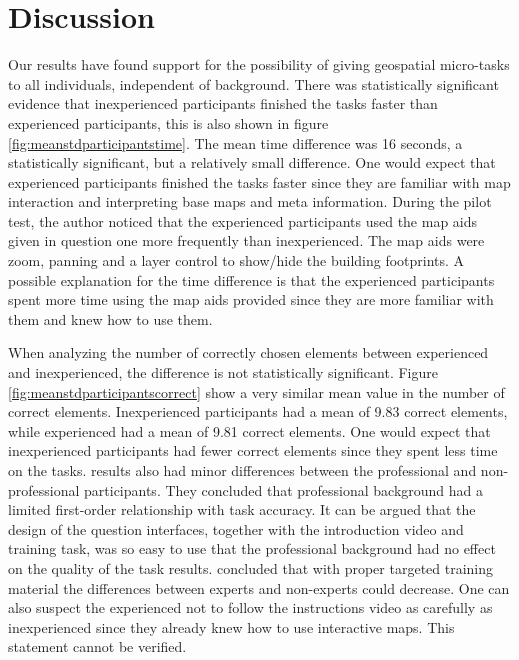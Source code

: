 \chapter{Discussion}

Our results have found support for the possibility of giving geospatial micro-tasks to all individuals, independent of background. There was statistically significant evidence that inexperienced participants finished the tasks faster than experienced participants, this is also shown in figure \ref{fig:meanstdparticipantstime}. The mean time difference was 16 seconds, a statistically significant, but a relatively small difference. One would expect that experienced participants finished the tasks faster since they are familiar with map interaction and interpreting base maps and meta information. During the pilot test, the author noticed that the experienced participants used the map aids given in question one more frequently than inexperienced. The map aids were zoom, panning and a layer control to show/hide the building footprints. A possible explanation for the time difference is that the experienced participants spent more time using the map aids provided since they are more familiar with them and knew how to use them. 

When analyzing the number of correctly chosen elements between experienced and inexperienced, the difference is not statistically significant. Figure \ref{fig:meanstdparticipantscorrect} show a very similar mean value in the number of correct elements. Inexperienced participants had a mean of 9.83 correct elements, while experienced had a mean of 9.81 correct elements. One would expect that inexperienced participants had fewer correct elements since they spent less time on the tasks. \cite{Salk2016} results also had minor differences between the professional and non-professional participants. They concluded that professional background had a limited first-order relationship with task accuracy. It can be argued that the design of the question interfaces, together with the introduction video and training task, was so easy to use that the professional background had no effect on the quality of the task results. \cite{See2013} concluded that with proper targeted training material the differences between experts and non-experts could decrease. One can also suspect the experienced not to follow the instructions video as carefully as inexperienced since they already knew how to use interactive maps. This statement cannot be verified.

